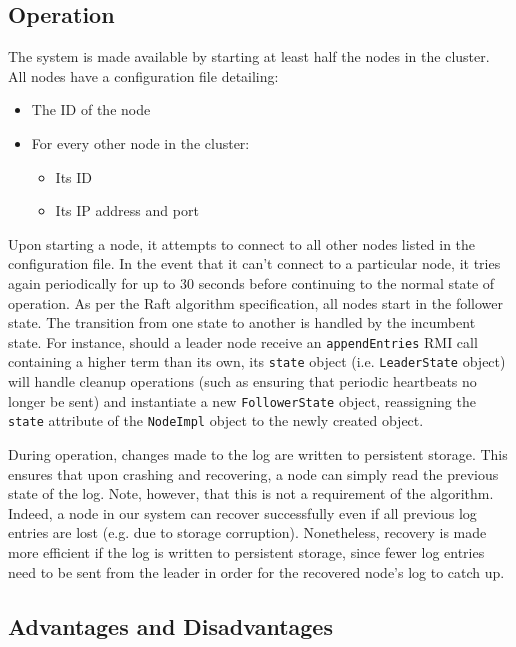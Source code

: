 \documentclass[12pt, a4paper]{article}
\begin{document}
\subsection{Operation}
The system is made available by starting at least half the nodes in the cluster. All nodes have a configuration file detailing:
\begin{itemize}
    \item The ID of the node
    \item For every other node in the cluster:
    \begin{itemize}
        \item Its ID
        \item Its IP address and port
    \end{itemize}
\end{itemize}
Upon starting a node, it attempts to connect to all other nodes listed in the configuration file. In the event that it can't connect to a particular node, it tries again periodically for up to 30 seconds before continuing to the normal state of operation. As per the Raft algorithm specification, all nodes start in the follower state. The transition from one state to another is handled by the incumbent state. For instance, should a leader node receive an \texttt{appendEntries} RMI call containing a higher term than its own, its \texttt{state} object (i.e. \texttt{LeaderState} object) will handle cleanup operations (such as ensuring that periodic heartbeats no longer be sent) and instantiate a new \texttt{FollowerState} object, reassigning the \texttt{state} attribute of the \texttt{NodeImpl} object to the newly created object.

During operation, changes made to the log are written to persistent storage. This ensures that upon crashing and recovering, a node can simply read the previous state of the log. Note, however, that this is not a requirement of the algorithm. Indeed, a node in our system can recover successfully even if all previous log entries are lost (e.g. due to storage corruption). Nonetheless, recovery is made more efficient if the log is written to persistent storage, since fewer log entries need to be sent from the leader in order for the recovered node's log to catch up.

\subsection{Advantages and Disadvantages}




\end{document}
